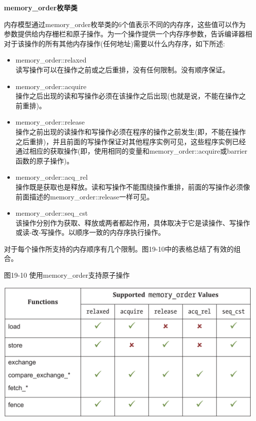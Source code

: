 \hspace*{\fill} \par %
\textbf{memory\_order枚举类}

内存模型通过memory\_order枚举类的6个值表示不同的内存序，这些值可以作为参数提供给内存栅栏和原子操作。为一个操作提供一个内存序参数，告诉编译器相对于该操作的所有其他内存操作(任何地址)需要以什么内存序，如下所述:\par

\begin{itemize}
	\item memory\_order::relaxed \\
	读写操作可以在操作之前或之后重排，没有任何限制。没有顺序保证。
	\item memory\_order::acquire \\
	操作之后出现的读和写操作必须在该操作之后出现(也就是说，不能在操作之前重排)。
	\item memory\_order::release \\ 
	操作之前出现的读操作和写操作必须在程序的操作之前发生(即，不能在操作之后重排)，并且前面的写操作保证对其他程序实例可见，这些程序实例已经通过相应的获取操作(即，使用相同的变量和memory\_order::acquire或barrier函数的原子操作)。
	\item memory\_order::acq\_rel \\
	操作既是获取也是释放。读和写操作不能围绕操作重排，前面的写操作必须像前面描述的memory\_order::release一样可见。
	\item memory\_order::seq\_cst \\
	该操作分别作为获取、释放或两者都起作用，具体取决于它是读操作、写操作或读-改-写操作。以顺序一致的内存序执行操作。
\end{itemize}

对于每个操作所支持的内存顺序有几个限制。图19-10中的表格总结了有效的组合。\par

\hspace*{\fill} \par %
图19-10 使用memory\_order支持原子操作
\begin{center}
	\includegraphics[width=1.0\textwidth]{content/chapter-19/images/8}
\end{center}

